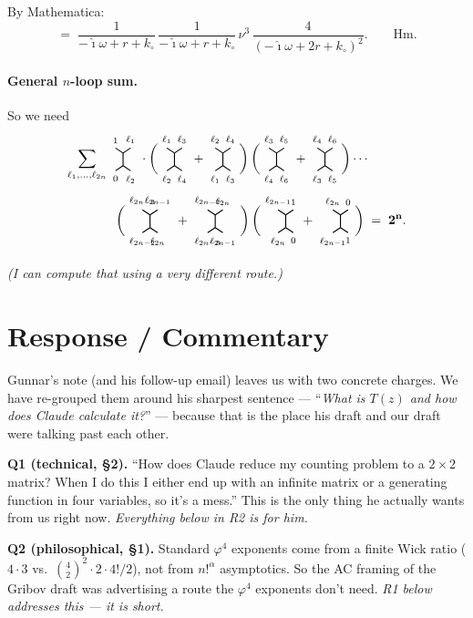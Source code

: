 \documentclass[11pt,a4paper]{article}
\newcommand{\Hvert}[4]{%
\begin{tikzpicture}[baseline=-0.5ex,scale=0.7]
  \draw[thick] (-0.3,0.45) node[above]{\scriptsize $#1$} -- (0,0.25);
  \draw[thick] (0.3,0.45) node[above]{\scriptsize $#2$} -- (0,0.25);
  \draw[thick] (0,0.25)--(0,-0.25);
  \draw[thick] (-0.3,-0.45) node[below]{\scriptsize $#3$} -- (0,-0.25);
  \draw[thick] (0.3,-0.45) node[below]{\scriptsize $#4$} -- (0,-0.25);
\end{tikzpicture}}
\begin{document}
By Mathematica:
\[
=\;\frac{1}{-\hat{\imath}\omega+r+k_\circ}\,\frac{1}{-\hat{\imath}\omega+r+k_\circ}\,\nu^3\,\frac{4}{(-\hat{\imath}\omega+2r+k_\circ)^2}. \qquad \text{Hm.}
\]

\paragraph{General $n$-loop sum.} So we need
\begin{align*}
\sum_{\ell_1,\ldots,\ell_{2n}} \Hvert{1}{\ell_1}{0}{\ell_2} \cdot
\bigg(\Hvert{\ell_1}{\ell_3}{\ell_2}{\ell_4}+\Hvert{\ell_2}{\ell_4}{\ell_1}{\ell_3}\bigg)\,
\bigg(\Hvert{\ell_3}{\ell_5}{\ell_4}{\ell_6}+\Hvert{\ell_4}{\ell_6}{\ell_3}{\ell_5}\bigg)\cdots&\\
\bigg(\Hvert{\ell_{2n-3}}{\ell_{2n-1}}{\ell_{2n-2}}{\ell_{2n}}+\Hvert{\ell_{2n-2}}{\ell_{2n}}{\ell_{2n-3}}{\ell_{2n-1}}\bigg)\,
\bigg(\Hvert{\ell_{2n-1}}{1}{\ell_{2n}}{0}+\Hvert{\ell_{2n}}{0}{\ell_{2n-1}}{1}\bigg) \;&=\; \mathbf{2^n}.
\end{align*}

\hfill\textit{(I can compute that using a very different route.)}

\bigskip

\begin{center}
\end{center}

\hrulefill

\section*{Response / Commentary}

\begin{commentbox}[title=Reading Gunnar's two questions]
Gunnar's note (and his follow-up email) leaves us with two concrete charges. We have re-grouped them around his sharpest sentence --- ``\emph{What is $T(z)$ and how does Claude calculate it?}'' --- because that is the place his draft and our draft were talking past each other.

\textbf{Q1 (technical, \S2).} ``How does Claude reduce my counting problem to a $2{\times}2$ matrix? When I do this I either end up with an infinite matrix or a generating function in four variables, so it's a mess.'' This is the only thing he actually wants from us right now. \emph{Everything below in R2 is for him.}

\textbf{Q2 (philosophical, \S1).} Standard $\varphi^4$ exponents come from a finite Wick ratio ($4\cdot 3$ vs.\ $\binom{4}{2}^2\!\cdot 2\cdot 4!/2$), not from $n!^\alpha$ asymptotics. So the AC framing of the Gribov draft was advertising a route the $\varphi^4$ exponents don't need. \emph{R1 below addresses this --- it is short.}
\end{commentbox}
\end{document}
